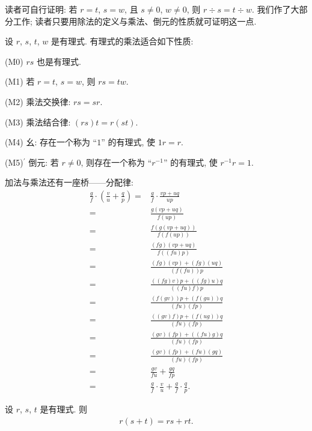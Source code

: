 读者可自行证明: 若 $r = t$, $s = w$, 且 $s \neq 0$, $w \neq 0$, 则 $r \div s = t \div w$. 我们作了大部分工作; 读者只要用除法的定义与乘法、倒元的性质就可证明这一点.

\begin{proposition}
    设 $r$, $s$, $t$, $w$ 是有理式. 有理式的乘法适合如下性质:

    (M0) $rs$ 也是有理式.

    (M1) 若 $r = t$, $s = w$, 则 $rs = tw$.

    (M2) 乘法交换律: $rs = sr$.

    (M3) 乘法结合律: $(rs)t = r(st)$.

    (M4) 幺: 存在一个称为 ``$1$'' 的有理式, 使 $1r = r$.

    (M5)$^{\prime}$ 倒元: 若 $r \neq 0$, 则存在一个称为 ``$r^{-1}$'' 的有理式, 使 $r^{-1} r = 1$.
\end{proposition}

加法与乘法还有一座桥——分配律:
\begin{align*}
    \frac{g}{f} \cdot \left( \frac{v}{u} + \frac{q}{p} \right)
    = {} & \frac{g}{f} \cdot \frac{vp + uq}{up}                           \\
    = {} & \frac{g(vp + uq)}{f(up)}                                       \\
    = {} & \frac{f(g(vp + uq))}{f(f(up))}                                 \\
    = {} & \frac{(fg)(vp + uq)}{f((fu)p)}                                 \\
    = {} & \frac{(fg)(vp) + (fg)(uq)}{(f(fu))p}                           \\
    = {} & \frac{((fg)v)p + ((fg)u)q}{((fu)f)p}                           \\
    = {} & \frac{(f(gv))p + (f(gu))q}{(fu)(fp)}                           \\
    = {} & \frac{((gv)f)p + (f(ug))q}{(fu)(fp)}                           \\
    = {} & \frac{(gv)(fp) + ((fu)g)q}{(fu)(fp)}                           \\
    = {} & \frac{(gv)(fp) + (fu)(gq)}{(fu)(fp)}                           \\
    = {} & \frac{gv}{fu} + \frac{gq}{fp}                                  \\
    = {} & \frac{g}{f} \cdot \frac{v}{u} + \frac{g}{f} \cdot \frac{q}{p}.
\end{align*}

\begin{proposition}
    设 $r$, $s$, $t$ 是有理式. 则
    \begin{align*}
        r (s + t) = rs + rt.
    \end{align*}
\end{proposition}

